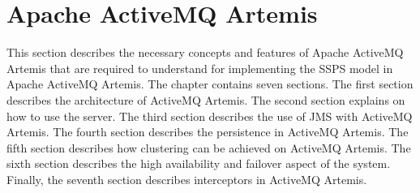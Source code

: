 \chapter{Apache ActiveMQ Artemis}\label{chapter:artemis}

This section describes the necessary concepts and features of Apache ActiveMQ Artemis that are required to understand for implementing the SSPS model in Apache ActiveMQ Artemis. The chapter contains seven sections. The first section describes the architecture of ActiveMQ Artemis. The second section explains on how to use the server. The third section describes the use of JMS with ActiveMQ Artemis. The fourth section describes the persistence in ActiveMQ Artemis. The fifth section describes how clustering can be achieved on ActiveMQ Artemis. The sixth section describes the high availability and failover aspect of the system. Finally, the seventh section describes interceptors in ActiveMQ Artemis.